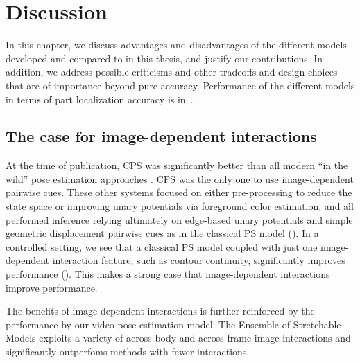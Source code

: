 \chapter{Discussion}\label{sec:discussion}

In this chapter, we discuss advantages and disadvantages of the different 
models developed  and compared to in this thesis, and justify our 
contributions. In addition, we address possible criticisms and other tradeoffs 
and design choices that are of importance beyond pure accuracy.  Performance of 
the different models in terms of part localization accuracy is 
in~.

\section{The case for image-dependent interactions}

At the time of publication, CPS was significantly better than all modern ``in 
the wild'' pose estimation approaches 
\citep{ferrari08,eichner09,devacrf,andriluka09}.  CPS was the only one to use 
image-dependent pairwise cues.  These other systems focused on either 
pre-processing to reduce the state space or improving unary potentials via 
foreground color estimation, and all performed inference relying ultimately on 
edge-based unary potentials and simple geometric displacement pairwise cues as 
in the classical PS model ().
In a controlled setting, we see that a classical PS model coupled with just one 
image-dependent interaction feature, such as contour continuity, significantly 
improves performance ().  This makes a strong case that 
image-dependent interactions improve performance.

The benefits of image-dependent interactions is further reinforced by the 
performance by our video pose estimation model.  The Ensemble of Stretchable 
Models exploits a variety of across-body and across-frame image interactions 
and significantly outperfoms methods with fewer interactions.


